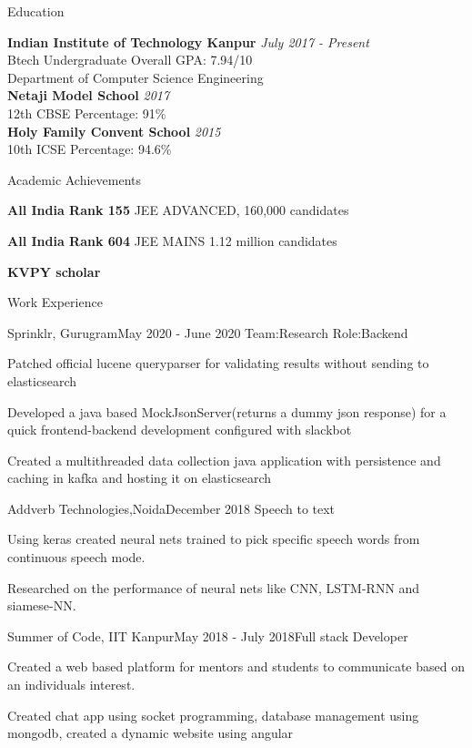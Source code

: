 \documentclass{resume}
\begin{document}
\begin{rSection}{Education}

{\bf Indian Institute of Technology Kanpur} \hfill {\em July 2017 - Present} 
\\ Btech Undergraduate \hfill { Overall GPA: 7.94/10}
\\ Department of Computer Science Engineering 
\\
{\bf Netaji Model School} \hfill {\em 2017} 
\\  12th CBSE\hfill { Percentage: 91\%} 
\\
{\bf Holy Family Convent School} \hfill {\em 2015} 
\\  10th ICSE\hfill { Percentage: 94.6\%} 


\end{rSection}


\begin{rSection}{Academic Achievements} \itemsep -2pt
\item \textbf{All India Rank 155} JEE ADVANCED, 160,000 candidates
\item \textbf{All India Rank 604} JEE MAINS 1.12 million candidates
\item \textbf{KVPY scholar}
\end{rSection}

\begin{rSection}{Work Experience}

\begin{rSubsection}{Sprinklr, Gurugram}{May 2020 - June 2020}{ }{Team:Research Role:Backend}
\item Patched official lucene queryparser for validating results without sending to elasticsearch
\item Developed a java based MockJsonServer(returns a dummy json response) for a quick frontend-backend development configured with slackbot
\item Created a multithreaded data collection java application with persistence and caching in kafka and hosting it on elasticsearch

\end{rSubsection}

\begin{rSubsection}{Addverb Technologies,Noida}{December 2018}{ }{Speech to text}
\item Using keras created neural nets trained to pick specific speech words from continuous speech mode.
\item Researched on the performance of neural nets like CNN, LSTM-RNN and siamese-NN.
\end{rSubsection}


\begin{rSubsection}{Summer of Code, IIT Kanpur}{May 2018 - July 2018}{Full stack Developer}{}
\item Created a web based platform for mentors and students to communicate based on an individuals interest.
\item Created chat app using socket programming, database management using mongodb, created a dynamic website using angular
\end{rSubsection}


\end{rSection}
\end{document}
